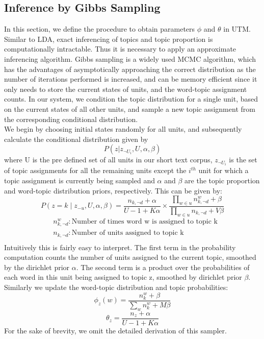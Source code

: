 \documentclass{sig-alternate-05-2015}
\begin{document}
\subsection{Inference by Gibbs Sampling}
In this section, we define the procedure to obtain parameters $\phi$ and $\theta$ in UTM. Similar to LDA, exact inferencing of topics and topic proportion is computationally intractable. Thus it is necessary to apply an approximate inferencing algorithm. Gibbs sampling is a widely used MCMC algorithm, which has the advantages of asymptotically approaching the correct distribution as the number of iterations performed is increased, and can be memory efficient since it only needs to store the current states of units, and the word-topic assignment counts. In our system, we condition the topic distribution for a single unit, based on the current states of all other units, and sample a new topic assignment from the corresponding conditional distribution.
\\[10pt]
We begin by choosing initial states randomly for all units, and subsequently calculate the conditional distribution given by $$P(z | z_{\neg U _{i}}, U, \alpha, \beta)$$  where U is the pre defined set of all units in our short text corpus, $z_{\neg U_{i}}$ is the set of topic assignments for all the remaining units except the $i^{th}$ unit for which a topic assignment is currently being sampled and $\alpha$ and $\beta$ are the topic proportion and word-topic distribution priors, respectively. This can be given by:
\[ P(z=k \mid z_{-u} , U, \alpha, \beta) = \frac{n_{k, \neg d} + \alpha}{U-1 + K \alpha} \times \frac{\prod\limits_{w \in u} n^w_{k, \neg d} + \beta }{\prod\limits_{w \in u} n_{k, \neg d} + V \beta} \]
\begin{align*}
& n^w_{k, \neg d} : \text{Number of times word w is assigned to topic k} \\
& n_{k, \neg d} : \text{Number of units assigned to topic k} \\
\end{align*}
Intuitively this is fairly easy to interpret. The first term in the probability computation counts the number of units assigned to the current topic, smoothed by the dirichlet prior $\alpha$. The second term is a product over the probabilities of each word in this unit being assigned to topic z, smoothed by dirichlet prior $\beta$. Similarly we update the word-topic distribution and topic probabilities: \\
$$\phi_{z}(w) = \frac{n^w_{k} + \beta}{\sum_{w}{n^w_k} + M\beta}$$
$$\theta_{z} = \frac{n_{z} + \alpha}{U-1 + K\alpha}$$
For the sake of brevity, we omit the detailed derivation of this sampler.
\end{document}
